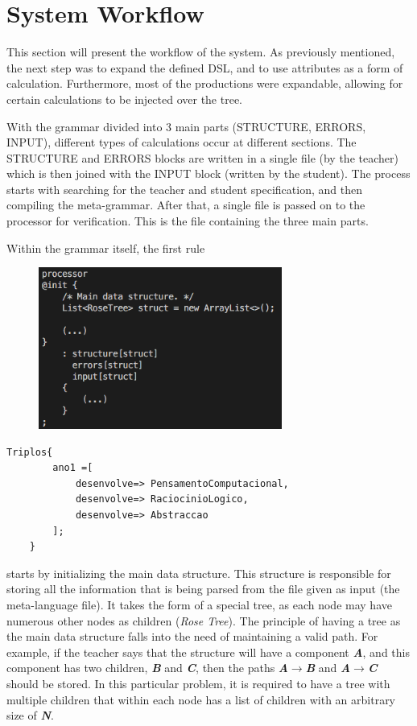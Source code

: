 \chapter{System Workflow} \label{system_workflow}

This section will present the workflow of the system. As previously mentioned, the next step was to expand the defined DSL, and to use attributes as a form of calculation. Furthermore, most of the productions were expandable, allowing for certain calculations to be injected over the tree.

With the grammar divided into 3 main parts (STRUCTURE, ERRORS, INPUT), different types of calculations occur at different sections. The STRUCTURE and ERRORS blocks are written in a single file (by the teacher) which is then joined with the INPUT block (written by the student). The process starts with searching for the teacher and student specification, and then compiling the meta-grammar. After that, a single file is passed on to the processor for verification. This is the file containing the three main parts.

Within the grammar itself, the first rule
\begin{figure}[h]
    \centering
    \includegraphics[width=8cm]{images/processor_expanded.png}
\end{figure}

\begin{lstlisting}[language=XML, caption= Concepts taught in the 1st year (fragment), label={lst:triplosAno1}]
    Triplos{
        ano1 =[
            desenvolve=> PensamentoComputacional,
            desenvolve=> RaciocinioLogico,
            desenvolve=> Abstraccao
        ];
    }
\end{lstlisting}

\noindent starts by initializing the main data structure. This structure is responsible for storing all the information that is being parsed from the file given as input (the meta-language file). It takes the form of a special tree, as each node may have numerous other nodes as children (\emph{Rose Tree}). The principle of having a tree as the main data structure falls into the need of maintaining a valid path. For example, if the teacher says that the structure will have a component \emph{\textbf{A}}, and this component has two children, \emph{\textbf{B}} and \emph{\textbf{C}}, then the paths \emph{\textbf{A$\rightarrow$B}} and \emph{\textbf{A$\rightarrow$C}} should be stored. In this particular problem, it is required to have a tree with multiple children that within each node has a list of children with an arbitrary size of \emph{\textbf{N}}.

